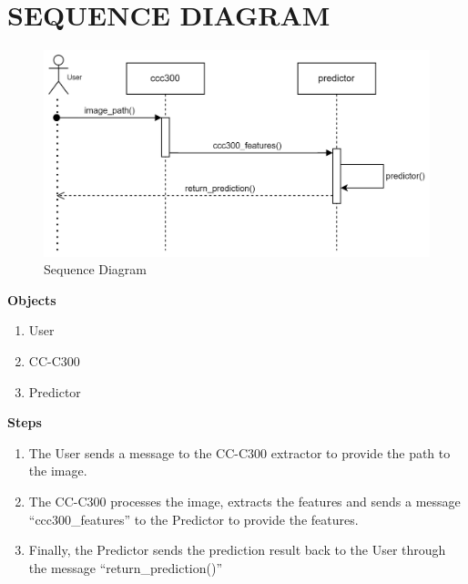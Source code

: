 \section{SEQUENCE DIAGRAM}
\begin{figure}[H]
    \centering
    \includegraphics[width=120mm]{./img/sequenceDiagram.png}
    \caption{Sequence Diagram}
\end{figure}
\large{\textbf{Objects}}
\begin{enumerate}[noitemsep]
    \item User
    \item CC-C300
    \item Predictor
\end{enumerate}
\large{\textbf{Steps}}
\begin{enumerate}[noitemsep]
    \item The User sends a message to the CC-C300 extractor to provide the path to the image.
    \item The CC-C300 processes the image, extracts the features and sends a message ``ccc300\_features'' to the Predictor to provide the features.
    \item Finally, the Predictor sends the prediction result back to the User through the message ``return\_prediction()''
\end{enumerate}

